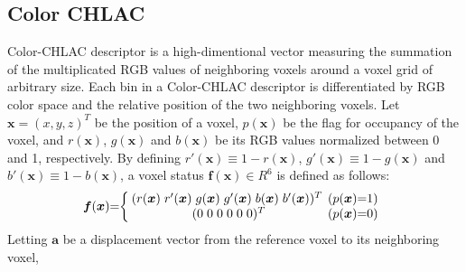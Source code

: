 \documentclass[conference]{sty/IEEEtran}
\begin{document}
\subsection{Color CHLAC}
Color-CHLAC descriptor is a high-dimentional vector measuring the summation of the multiplicated RGB values of neighboring voxels around a voxel grid of arbitrary size. 
Each bin in a Color-CHLAC descriptor is differentiated by RGB color space and the relative position of the two neighboring voxels. 
Let $\bm{x}=(x,y,z)^T$ be the position of a voxel, $p(\bm{x})$ be the flag for occupancy of the voxel, 
 and $r(\bm{x})$, $g(\bm{x})$ and $b(\bm{x})$ be its RGB values normalized between 0 and 1, respectively. 
By defining $r'(\bm{x}) \equiv 1 - r(\bm{x})$, $g'(\bm{x}) \equiv 1 - g(\bm{x})$ and $b'(\bm{x}) \equiv 1 - b(\bm{x})$, 
    a voxel status $\bm{f}(\bm{x})\in R^6$ is defined as follows: 
\begin{eqnarray*}
  \label{eq:voxel}
  \bm{f}({\bm x})\hspace{-1mm}=\hspace{-1mm}\left\{
  \begin{array}{cc}
    \hspace{-1mm}
    (r({\bm x})\hspace{1mm} r'({\bm x}) \hspace{1mm}g({\bm x}) \hspace{1mm}g'({\bm x}) \hspace{1mm}b({\bm x}) \hspace{1mm}b'({\bm x}))^T & \hspace{-2mm}(p({\bm x})\hspace{-1mm}=\hspace{-1mm}1) \\
    (0\hspace{1mm}0\hspace{1mm}0\hspace{1mm}0\hspace{1mm}0\hspace{1mm}0)^T & \hspace{-2mm}(p({\bm x})\hspace{-1mm}=\hspace{-1mm}0)
  \end{array}\right.
\end{eqnarray*}
%
Letting ${\bm a}$ be a displacement vector from the reference voxel to its neighboring voxel, 
\end{document}
